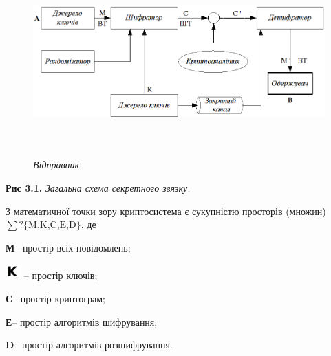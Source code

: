 \documentclass[a4paper]{article}
\newcounter{}
\begin{document}
\bigskip

{\centering \par}

\begin{figure}
\centering
\begin{minipage}{6.7165in}
{\centering 
\includegraphics[width=6.5909in,height=2.5602in]{crypt-img/crypt-img4.png}
\par}
\begin{minipage}{1.1161in}
{\itshape
Відправник}
\end{minipage}\end{minipage}
\end{figure}
{\centering
\textbf{Рис 3.1.} \textit{Загальна схема секретного зв{\textquotesingle}язку.}
\par}


\bigskip

З математичної точки зору криптосистема є сукупністю просторів (множин)  ${\sum
?\{\text{M,K,C,E,D}\}}$,  де 

\textbf{М}– простір всіх повідомлень; $ $

 \includegraphics[width=0.2311in,height=0.2311in]{crypt-img/crypt-img5.png}  –
простір ключів;

\textbf{С}– простір криптограм;

\textbf{Е}– простір алгоритмів шифрування;

\textbf{D}– простір алгоритмів розшифрування.
\end{document}
